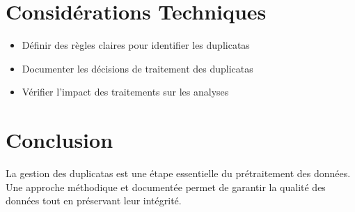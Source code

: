 \documentclass{article}
\begin{document}
\section{Considérations Techniques}
\begin{itemize}
    \item Définir des règles claires pour identifier les duplicatas
    \item Documenter les décisions de traitement des duplicatas
    \item Vérifier l'impact des traitements sur les analyses
\end{itemize}

\section{Conclusion}
La gestion des duplicatas est une étape essentielle du prétraitement des données. Une approche méthodique et documentée permet de garantir la qualité des données tout en préservant leur intégrité.



\end{document}
